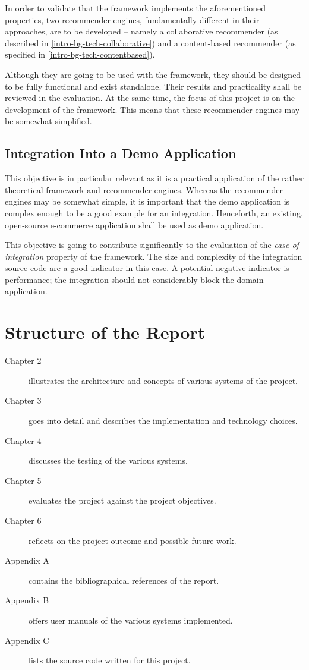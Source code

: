 In order to validate that the framework implements the aforementioned properties, two recommender engines, fundamentally different in their approaches, are to be developed -- namely a collaborative recommender (as described in \ref{intro-bg-tech-collaborative}) and a content-based recommender (as specified in \ref{intro-bg-tech-contentbased}).

Although they are going to be used with the framework, they should be designed to be fully functional and exist standalone. Their results and practicality shall be reviewed in the evaluation. At the same time, the focus of this project is on the development of the framework. This means that these recommender engines may be somewhat simplified.

\subsection{Integration Into a Demo Application}
\label{intro-objectives-demo}

This objective is in particular relevant as it is a practical application of the rather theoretical framework and recommender engines. Whereas the recommender engines may be somewhat simple, it is important that the demo application is complex enough to be a good example for an integration. Henceforth, an existing, open-source e-commerce application shall be used as demo application.

This objective is going to contribute significantly to the evaluation of the \emph{ease of integration} property of the framework. The size and complexity of the integration source code are a good indicator in this case. A potential negative indicator is performance; the integration should not considerably block the domain application.

\section{Structure of the Report}

\begin{description}
    \item[Chapter 2] illustrates the architecture and concepts of various systems of the project.
    \item[Chapter 3] goes into detail and describes the implementation and technology choices.
    \item[Chapter 4] discusses the testing of the various systems.
    \item[Chapter 5] evaluates the project against the project objectives.
    \item[Chapter 6] reflects on the project outcome and possible future work.
    \item[Appendix A] contains the bibliographical references of the report.
    \item[Appendix B] offers user manuals of the various systems implemented.
    \item[Appendix C] lists the source code written for this project.
\end{description}